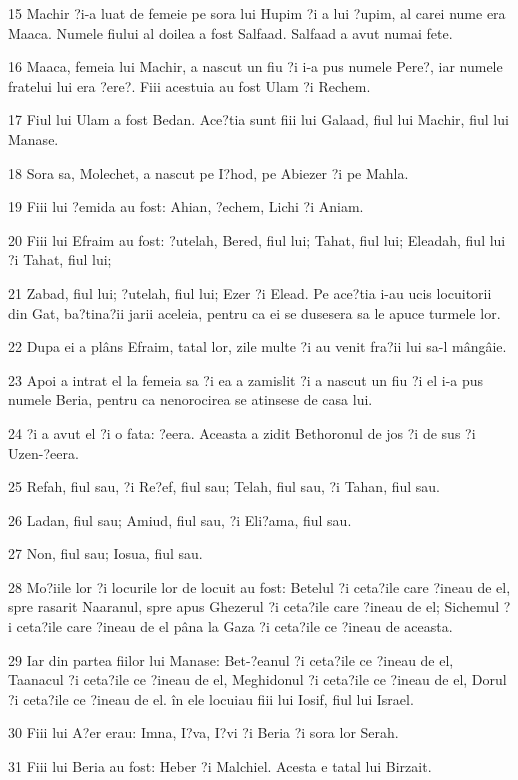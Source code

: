 \par 15 Machir ?i-a luat de femeie pe sora lui Hupim ?i a lui ?upim, al carei nume era Maaca. Numele fiului al doilea a fost Salfaad. Salfaad a avut numai fete.
\par 16 Maaca, femeia lui Machir, a nascut un fiu ?i i-a pus numele Pere?, iar numele fratelui lui era ?ere?. Fiii acestuia au fost Ulam ?i Rechem.
\par 17 Fiul lui Ulam a fost Bedan. Ace?tia sunt fiii lui Galaad, fiul lui Machir, fiul lui Manase.
\par 18 Sora sa, Molechet, a nascut pe I?hod, pe Abiezer ?i pe Mahla.
\par 19 Fiii lui ?emida au fost: Ahian, ?echem, Lichi ?i Aniam.
\par 20 Fiii lui Efraim au fost: ?utelah, Bered, fiul lui; Tahat, fiul lui; Eleadah, fiul lui ?i Tahat, fiul lui;
\par 21 Zabad, fiul lui; ?utelah, fiul lui; Ezer ?i Elead. Pe ace?tia i-au ucis locuitorii din Gat, ba?tina?ii jarii aceleia, pentru ca ei se dusesera sa le apuce turmele lor.
\par 22 Dupa ei a plâns Efraim, tatal lor, zile multe ?i au venit fra?ii lui sa-l mângâie.
\par 23 Apoi a intrat el la femeia sa ?i ea a zamislit ?i a nascut un fiu ?i el i-a pus numele Beria, pentru ca nenorocirea se atinsese de casa lui.
\par 24 ?i a avut el ?i o fata: ?eera. Aceasta a zidit Bethoronul de jos ?i de sus ?i Uzen-?eera.
\par 25 Refah, fiul sau, ?i Re?ef, fiul sau; Telah, fiul sau, ?i Tahan, fiul sau.
\par 26 Ladan, fiul sau; Amiud, fiul sau, ?i Eli?ama, fiul sau.
\par 27 Non, fiul sau; Iosua, fiul sau.
\par 28 Mo?iile lor ?i locurile lor de locuit au fost: Betelul ?i ceta?ile care ?ineau de el, spre rasarit Naaranul, spre apus Ghezerul ?i ceta?ile care ?ineau de el; Sichemul ?i ceta?ile care ?ineau de el pâna la Gaza ?i ceta?ile ce ?ineau de aceasta.
\par 29 Iar din partea fiilor lui Manase: Bet-?eanul ?i ceta?ile ce ?ineau de el, Taanacul ?i ceta?ile ce ?ineau de el, Meghidonul ?i ceta?ile ce ?ineau de el, Dorul ?i ceta?ile ce ?ineau de el. în ele locuiau fiii lui Iosif, fiul lui Israel.
\par 30 Fiii lui A?er erau: Imna, I?va, I?vi ?i Beria ?i sora lor Serah.
\par 31 Fiii lui Beria au fost: Heber ?i Malchiel. Acesta e tatal lui Birzait.
